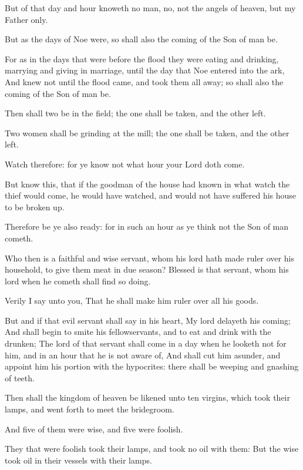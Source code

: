 \Verse But of that day and hour knoweth no man, no, not the angels of heaven, but my Father only.

\Verse But as the days of Noe were, so shall also the coming of the Son of man be.

\Verse For as in the days that were before the flood they were eating and drinking, marrying and giving in marriage, until the day that Noe entered into the ark, \Verse And knew not until the flood came, and took them all away; so shall also the coming of the Son of man be.

\Verse Then shall two be in the field; the one shall be taken, and the other left.

\Verse Two women shall be grinding at the mill; the one shall be taken, and the other left.

\Verse Watch therefore: for ye know not what hour your Lord doth come.

\Verse But know this, that if the goodman of the house had known in what watch the thief would come, he would have watched, and would not have suffered his house to be broken up.

\Verse Therefore be ye also ready: for in such an hour as ye think not the Son of man cometh.

\Verse Who then is a faithful and wise servant, whom his lord hath made ruler over his household, to give them meat in due season?  \Verse Blessed is that servant, whom his lord when he cometh shall find so doing.

\Verse Verily I say unto you, That he shall make him ruler over all his goods.

\Verse But and if that evil servant shall say in his heart, My lord delayeth his coming; \Verse And shall begin to smite his fellowservants, and to eat and drink with the drunken; \Verse The lord of that servant shall come in a day when he looketh not for him, and in an hour that he is not aware of, \Verse And shall cut him asunder, and appoint him his portion with the hypocrites: there shall be weeping and gnashing of teeth.


\Chapter
\Verse Then shall the kingdom of heaven be likened unto ten virgins, which took their lamps, and went forth to meet the bridegroom.

\Verse And five of them were wise, and five were foolish.

\Verse They that were foolish took their lamps, and took no oil with them: \Verse But the wise took oil in their vessels with their lamps.


